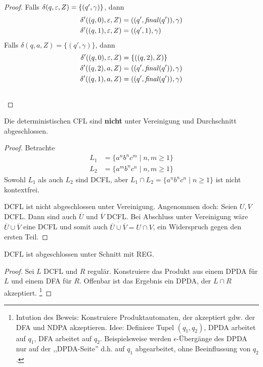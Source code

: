 {\begin{proof}
  Falls $\delta(q,\varepsilon,Z) = \{(q',\gamma)\}$, dann
  \begin{align*}
    \delta'((q,0),\varepsilon,Z) &= ((q',\mathit{final} (q')),\gamma)
    \\
    \delta'((q,1),\varepsilon,Z) &= ((q',1),\gamma)
  \end{align*}
  Falls $\delta(q,a,Z) = \{(q',\gamma)\}$, dann
  \begin{align*}
    \delta'((q,0), \Eps, Z) &= \{ ((q,2), Z) \} \\
    \delta'((q,2), a, Z) &=((q',\mathit{final} (q')), \gamma)
    \\
    \delta'((q,1), a, Z) &=
    ((q',\mathit{final} (q')), \gamma)
    \\ \tag*{\qedhere}    %
  \end{align*}
\end{proof}
\begin{Satz}
    Die deterministischen \ac{CFL} sind \textbf{nicht} unter Vereinigung und Durchschnitt abgeschlossen.
\end{Satz}
\begin{proof}
    Betrachte
    \begin{align*}
        L_1 &= \{ a^nb^nc^m \mid n, m \ge 1 \} \\
        L_2 &= \{ a^mb^nc^n \mid n, m \ge 1 \}
    \end{align*}
    Sowohl $L_1$ als auch $L_2$ sind DCFL, aber $L_1 \cap L_2 = \{ a^nb^nc^n \mid n \ge 1\}$ ist nicht kontextfrei.
    
    DCFL ist nicht abgeschlossen unter Vereinigung. Angenommen doch: Seien $U, V$ DCFL. Dann sind auch $\overline{U}$ und $\overline{V}$ DCFL. Bei Abschluss unter Vereinigung wäre $\overline{U} \cup \overline{V}$ eine DCFL und somit auch $\overline{\overline{U} \cup \overline{V}} = U \cap V$, ein Widerspruch gegen den ersten Teil.
\end{proof}
\begin{Satz}
    DCFL ist abgeschlossen unter Schnitt mit REG.
\end{Satz}
\begin{proof}
    Sei $L$ DCFL und $R$ regulär.
    Konstruiere das Produkt aus einem DPDA für $L$ und einem DFA für $R$.
    Offenbar ist das Ergebnis ein DPDA, der $L\cap R$ akzeptiert. \footnote{
    Intution des Beweis: Konstruiere Produktautomaten, der akzeptiert gdw. der DFA und NDPA akzeptieren. Idee: Definiere Tupel $(q_1, q_2)$, DPDA arbeitet auf $q_1$, DFA arbeitet auf $q_2$. Beispielsweise werden $\epsilon$-Übergänge des DPDA nur auf der ,,DPDA-Seite'' d.h. auf $q_1$ abgearbeitet, ohne Beeinflussung von $q_2$.
    }


\end{proof}}
